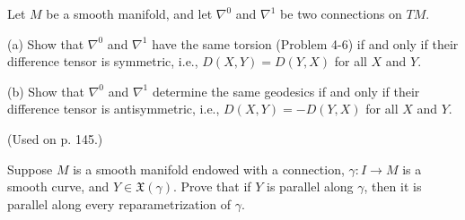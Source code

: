\begin{exercise}
\label{prob:connections-difference-tensor}
Let $M$ be a smooth manifold, and let $\nabla^0$ and $\nabla^1$ be two connections on $TM$.

(a) Show that $\nabla^0$ and $\nabla^1$ have the same torsion (Problem 4-6) if and only if their difference tensor is symmetric, i.e., $D(X,Y) = D(Y,X)$ for all $X$ and $Y$.

(b) Show that $\nabla^0$ and $\nabla^1$ determine the same geodesics if and only if their difference tensor is antisymmetric, i.e., $D(X,Y) = -D(Y,X)$ for all $X$ and $Y$.

(Used on p. 145.)
\end{exercise}

\begin{exercise}
\label{prob:parallel-reparametrization}
Suppose $M$ is a smooth manifold endowed with a connection, $\gamma: I \to M$ is a smooth curve, and $Y \in \mathfrak{X}(\gamma)$. Prove that if $Y$ is parallel along $\gamma$, then it is parallel along every reparametrization of $\gamma$.
\end{exercise}

